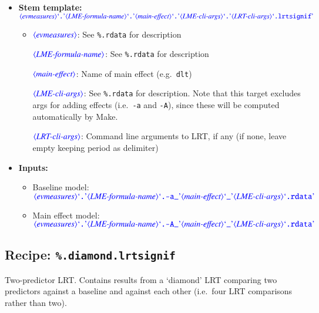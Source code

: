 \documentclass[12pt]{report}
\def\blue{\color{blue}}
\begin{document}
\begin{itemize}
\item\textbf{Stem template:}\\
$\dtype{evmeasures} \dcode{.} \dtype{LME-formula-name} \dcode{.} \dtype{main-effect} \dcode{.} \dtype{LME-cli-args} \dcode{.} \dtype{LRT-cli-args} \dcode{.lrtsignif}$
\begin{itemize}
\item
$\dtype{evmeasures}$: See {\tt\blue \%.rdata} for description

$\dtype{LME-formula-name}$: See {\tt\blue \%.rdata} for description

$\dtype{main-effect}$: Name of main effect (e.g.\ {\tt\blue dlt})

$\dtype{LME-cli-args}$: See {\tt\blue \%.rdata} for description.
Note that this target excludes args for adding effects (i.e.\ {\tt\blue -a} and {\tt\blue -A}), since these will be computed automatically by Make.

$\dtype{LRT-cli-args}$: Command line arguments to LRT, if any (if none, leave empty keeping period as delimiter)

\end{itemize}

\item\textbf{Inputs:}
\begin{itemize}
\item Baseline model: $\dtype{evmeasures} \dcode{.} \dtype{LME-formula-name} \dcode{.-a\_} \dtype{main-effect} \dcode{\_} \dtype{LME-cli-args} \dcode{.rdata}$ 
\item Main effect model: $\dtype{evmeasures} \dcode{.} \dtype{LME-formula-name} \dcode{.-A\_} \dtype{main-effect} \dcode{\_} \dtype{LME-cli-args} \dcode{.rdata}$ 
\end{itemize}
\end{itemize}

\subsection{Recipe: {\blue\tt \%.diamond.lrtsignif}}

Two-predictor LRT.
Contains results from a `diamond' LRT comparing two predictors against a baseline and against each other (i.e.\ four LRT comparisons rather than two).
\end{document}
